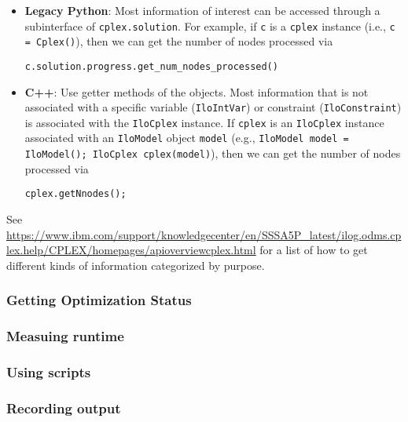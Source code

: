 \documentclass[12pt]{article}
\begin{document}
\begin{itemize}
\begin{itemize}
            \item \textbf{Legacy Python}: Most information of interest can be accessed through a subinterface of \texttt{cplex.solution}. For example, if \texttt{c} is a \texttt{cplex} instance (i.e., \texttt{c = Cplex()}), then we can get the number of nodes processed via
\begin{verbatim}
c.solution.progress.get_num_nodes_processed()
\end{verbatim}
            \item \textbf{C++}: Use getter methods of the objects. Most information that is not associated with a specific variable (\texttt{IloIntVar}) or constraint (\texttt{IloConstraint}) is associated with the \texttt{IloCplex} instance. If \texttt{cplex} is an \texttt{IloCplex} instance associated with an \texttt{IloModel} object \texttt{model} (e.g., \texttt{IloModel model = IloModel(); IloCplex cplex(model)}), then we can get the number of nodes processed via
\begin{verbatim}
cplex.getNnodes();
\end{verbatim}
        \end{itemize}
        See \url{https://www.ibm.com/support/knowledgecenter/en/SSSA5P_latest/ilog.odms.cplex.help/CPLEX/homepages/apioverviewcplex.html} for a list of how to get different kinds of information categorized by purpose.
\end{itemize}

\subsubsection{Getting Optimization Status}


\subsubsection{Measuing runtime}
\subsubsection{Using scripts}
\subsubsection{Recording output}

\printbibliography
\end{document}
